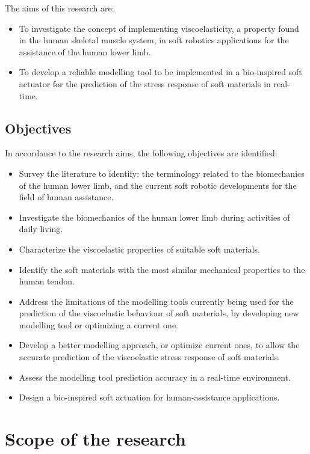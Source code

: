 The aims of this research are:

\begin{itemize}
    \item To investigate the concept of implementing viscoelasticity, a property found in the human skeletal muscle system, in soft robotics applications for the assistance of the human lower limb.
    \item To develop a reliable modelling tool to be implemented in a bio-inspired soft actuator for the prediction of the stress response of soft materials in real-time.
\end{itemize}

\subsection{Objectives}

In accordance to the research aims, the following objectives are identified:

\begin{itemize}
    \item Survey the literature to identify: the terminology related to the biomechanics of the human lower limb, and the current soft robotic developments for the field of human assistance.
    \item Investigate the biomechanics of the human lower limb during activities of daily living.
    \item Characterize the viscoelastic properties of suitable soft materials.
    \item Identify the soft materials with the most similar mechanical properties to the human tendon.
    \item Address the limitations of the modelling tools currently being used for the prediction of the viscoelastic behaviour of soft materials, by developing new modelling tool or optimizing a current one.
    \item Develop a better modelling approach, or optimize current ones, to allow the accurate prediction of the viscoelastic stress response of soft materials.
    \item Assess the modelling tool prediction accuracy in a real-time environment.
    \item Design a bio-inspired soft actuation for human-assistance applications.
\end{itemize}

\section{Scope of the research}

